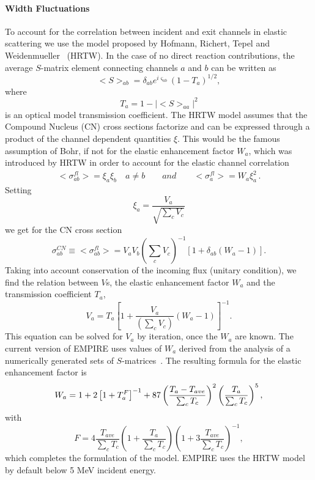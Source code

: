 \paragraph{Width Fluctuations}

To account for the correlation between incident and exit channels in elastic
scattering we use the model proposed by Hofmann, Richert, Tepel and
Weidenmueller~\cite{HRTW} (HRTW). In the case of no direct reaction
contributions, the average $S$-matrix element connecting channels $a$ and $b$
can be written as
\begin{equation}
<S>_{ab}=\delta_{ab}e^{i\varsigma_{ab}}(1-T_{a})^{1/2},  \label{Sab}
\end{equation}
\noindent where
\begin{equation}
T_{a}=1-|<S>_{aa}|^{2}  \label{Ta}
\end{equation}
is an optical model transmission coefficient. The HRTW model assumes that
the Compound Nucleus (CN) cross sections factorize and can be expressed
through a product of the channel dependent quantities $\xi$. This would be
the famous assumption of Bohr, if not for the elastic enhancement factor $%
W_{a} $, which was introduced by HRTW in order to account for the
elastic channel correlation
\begin{eqnarray}
<\sigma_{ab}^{fl}>=\xi_{a}\xi_{b}\quad a\neq b \qquad and \qquad
<\sigma_{a}^{fl}>=W_{a}\xi_{a}^{2}\,.  \label{Sig-fluc}
\end{eqnarray}
Setting
\begin{equation}
\xi_{a}=%
\frac{V_{a}}{\sqrt{\sum_{c}V_{c}}}  \label{ksi}
\end{equation}
we get for the CN cross section
\begin{equation}
\sigma_{ab}^{CN}\equiv<\sigma_{ab}^{fl}>=V_{a}V_{b}\left(\sum_{c}V_{c}%
\right)^{-1}\left[1+\delta_{ab}\left(W_{a}-1\right)\right].
\label{Sig-flucV}
\end{equation}
Taking into account conservation of the incoming flux (unitary
condition), we find the relation between $V$s, the elastic enhancement factor
 $W_{a}$ and the transmission coefficient $T_{a}$,
\begin{equation}
V_{a}=T_{a}\left[1+\frac{V_{a}}{\left(\sum_{c}V_{c}\right)}%
\left(W_{a}-1\right)\right]^{-1}.  \label{Va}
\end{equation}
This equation can be solved for $V_{a}$ by iteration, once the $W_{a}$ are
known. The current version of EMPIRE uses values of $W_{a}$ derived from the analysis
of a numerically generated sets of $S$-matrices~\cite{HHM}. The resulting
formula for the elastic enhancement factor is
\begin{equation}
W_{a}=1+2\left[1+T_{a}^{F}\right]^{-1}+87\left(\frac{T_{a}-T_{ave}}{%
\sum_{c}T_{c}}\right)^{2}\left(\frac{T_{a}}{\sum_{c}T_{c}}\right)^{5},
\label{Wa}
\end{equation}
with
\begin{equation}
F=4\frac{T_{ave}}{\sum_{c}T_{c}}\left(1+\frac{T_{a}}{\sum_{c}T_{c}}%
\right)\left(1+3\frac{T_{ave}}{\sum_{c}T_{c}}\right)^{-1},  \label{Wa-F}
\end{equation}
which completes the formulation of the model. EMPIRE uses the HRTW model
by default below 5 MeV incident energy.

